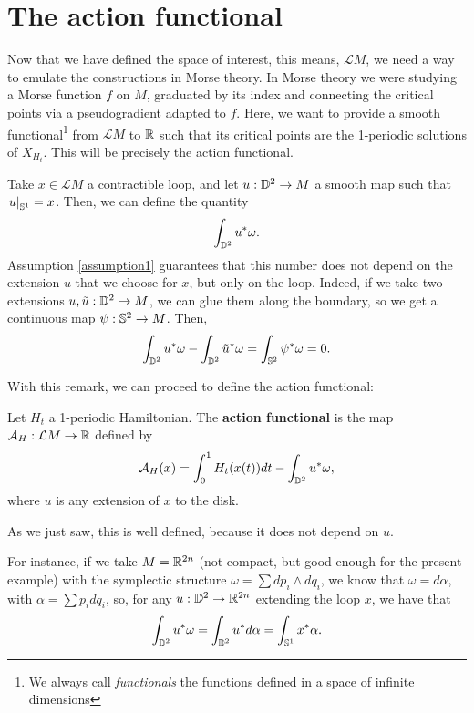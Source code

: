 \section{The action functional}

Now that we have defined the space of interest, this means, $\mathcal{L}M$, we need a way to emulate the constructions in Morse theory. In Morse theory we were studying a Morse function $f$ on $M$, graduated by its index and connecting the critical points via a pseudogradient adapted to $f$. Here, we want to provide a smooth functional\footnote{We always call {\it functionals} the functions defined in a space of infinite dimensions} from $\mathcal{L}M$ to $\mathbb{R}$ such that its critical points are the 1-periodic solutions of $X_{H_t}$. This will be precisely the action functional.

\begin{rmrk}
Take $x \in \mathcal{L}M$ a contractible loop, and let $u : \mathbb{D}^2 \rightarrow M$ a smooth map such that $\left. u \right|_{\mathbb{S}^1} = x$. Then, we can define the quantity
$$\int_{\mathbb{D}^2} u^{\ast}\omega .$$
Assumption \ref{assumption1} guarantees that this number does not depend on the extension $u$ that we choose for $x$, but only on the loop. Indeed, if we take two extensions $u, \tilde{u} : \mathbb{D}^2 \rightarrow M$, we can glue them along the boundary, so we get a continuous map $\psi : \mathbb{S}^2 \rightarrow M$. Then,
$$\int_{\mathbb{D}^2} u^{\ast} \omega - \int_{\mathbb{D}^2} \tilde{u}^{\ast} \omega = \int_{\mathbb{S}^2} \psi^{\ast} \omega = 0 .$$
\end{rmrk}

With this remark, we can proceed to define the action functional:

\begin{deff}
Let $H_t$ a 1-periodic Hamiltonian. The {\bf action functional} is the map $\mathcal{A}_H : \mathcal{L}M \rightarrow \mathbb{R}$ defined by
$$\mathcal{A}_H(x) = \int_0^1 H_t(x(t)) d t - \int_{\mathbb{D}^2} u^{\ast} \omega ,$$
where $u$ is any extension of $x$ to the disk.
\end{deff}

As we just saw, this is well defined, because it does not depend on $u$.

For instance, if we take $M = \mathbb{R}^{2n}$ (not compact, but good enough for the present example) with the symplectic structure $\omega = \sum d p_i \wedge d q_i$, we know that $\omega = d \alpha$, with $\alpha = \sum p_i d q_i$, so, for any $u : \mathbb{D}^2 \rightarrow \mathbb{R}^{2n}$ extending the loop $x$, we have that
$$\int_{\mathbb{D}^2} u^{\ast} \omega = \int_{\mathbb{D}^2}  u^{\ast} d \alpha = \int_{\mathbb{S}^1} x^{\ast} \alpha .$$

